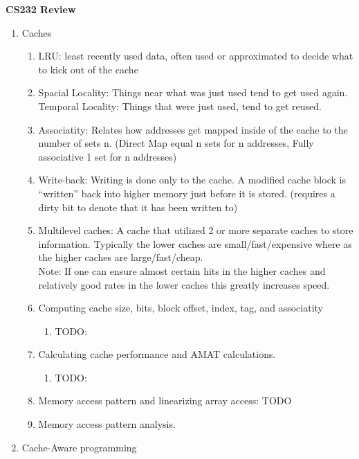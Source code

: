 \documentclass[12pt]{article}
\renewcommand{\=}[1]{\stackrel{#1}{=}} %
\theoremstyle{definition}
\theoremstyle{remark}
\begin{document}
\begin{center}
  {\LARGE
    \textbf{CS232 Review}\\
  }
  \begin{enumerate}
  \item Caches
    \begin{enumerate}
    \item LRU: least recently used data, often used or approximated to
      decide what to kick out of the cache
    \item
      Spacial Locality: Things near what was just used tend to get used
      again.\\
      Temporal Locality: Things that were just used, tend to get reused.
    \item Associatity: Relates how addresses get mapped inside of
      the cache to the number of sets n. (Direct Map equal n sets for
      n addresses, Fully associative 1 set for n addresses)
    \item Write-back: Writing is done only to the cache. A modified
      cache block is ``written'' back into higher memory just before
      it is stored. (requires a dirty bit to denote that it has been
      written to)
    \item Multilevel caches: A cache that utilized 2 or more separate
      caches to store information. Typically the lower caches are
      small/fast/expensive where as the higher caches are
      large/fast/cheap.\\
      Note: If one can ensure almost certain hits in the higher caches
      and relatively good rates in the lower caches this greatly
      increases speed.
    \item Computing cache size, bits, block offset, index, tag, and associatity
      \begin{enumerate}
      \item TODO: 
      \end{enumerate}
    \item Calculating cache performance and AMAT calculations.
      \begin{enumerate}
      \item TODO:
      \end{enumerate}
    \item Memory access pattern and linearizing array access: TODO
    \item Memory access pattern analysis.
    \end{enumerate}
  \item Cache-Aware programming
    \begin{enumerate}

\end{enumerate}
\end{enumerate}
\end{center}
\end{document}
